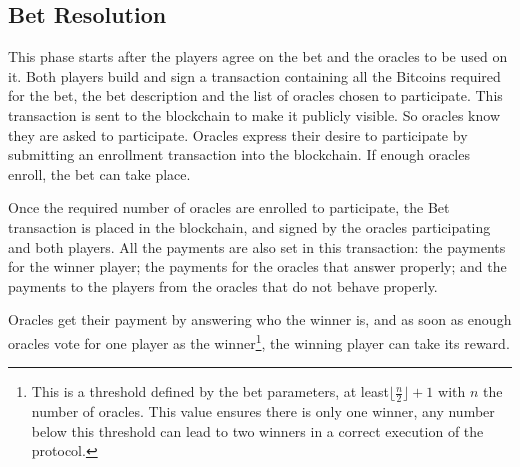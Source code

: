 \subsection{Bet Resolution}
This phase starts after the players agree on the bet and the oracles to be used
  on it.
Both players build and sign a transaction containing all the Bitcoins required
  for the bet, the bet description and the list of oracles chosen to
  participate.
This transaction is sent to the blockchain to make it publicly visible. So
  oracles know they are asked to participate.
Oracles express their desire to participate by submitting an enrollment
  transaction into the blockchain.
If enough oracles enroll, the bet can take place.

Once the required number of oracles are enrolled to participate, the Bet
  transaction is placed in the blockchain, and signed by the oracles
  participating and both players.
All the payments are also set in this transaction: the payments for the winner
  player; the payments for the oracles that answer properly; and the payments
  to the players from the oracles that do not behave properly.

Oracles get their payment by answering who the winner is, and as soon as
  enough oracles vote for one player as the winner\footnote{This is a
  threshold defined by the bet parameters, at least$\lfloor \frac{n}{2}
  \rfloor + 1$ with $n$ the number of oracles. This value ensures there is only
  one winner, any number below this threshold can lead to two winners
  in a correct execution of the protocol.}, the winning  player can take
  its reward.
